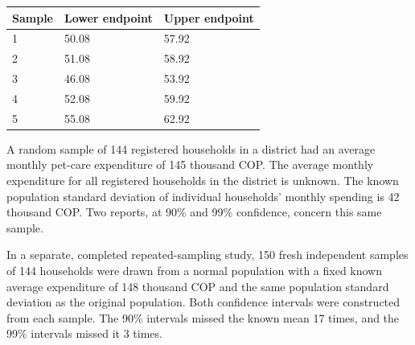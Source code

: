 \begin{center}\begin{tabular}{@{}lll@{}}\toprule
Sample & Lower endpoint & Upper endpoint\\\midrule
1 & 50.08 & 57.92\\
2 & 51.08 & 58.92\\
3 & 46.08 & 53.92\\
4 & 52.08 & 59.92\\
5 & 55.08 & 62.92\\
\bottomrule\end{tabular}\end{center}


\BlankInformationTable

\clearpage
{}

\workspace{1.5in}
\vfill


\clearpage
{}
A random sample of 144 registered households in a district had an average monthly pet-care expenditure of 145 thousand COP. The average monthly expenditure for all registered households in the district is unknown. The known population standard deviation of individual households' monthly spending is 42 thousand COP. Two reports, at 90\% and 99\% confidence, concern this same sample.

In a separate, completed repeated-sampling study, 150 fresh independent samples of 144 households were drawn from a normal population with a fixed known average expenditure of 148 thousand COP and the same population standard deviation as the original population. Both confidence intervals were constructed from each sample. The 90\% intervals missed the known mean 17 times, and the 99\% intervals missed it 3 times.

